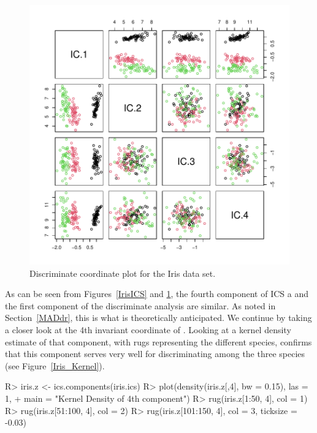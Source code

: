 \documentclass[article,nojss]{jss}
\begin{document}
\begin{figure}[t]
\begin{center}
\includegraphics{ICS-019}
\caption{Discriminate coordinate plot for the Iris data set.}
\label{IrisDisc}
\end{center}
\end{figure}


As can be seen from Figures~\ref{IrisICS} and \ref{IrisDisc}, the fourth component of {ICS} a and the first
component of the discriminate analysis are similar.  As noted in Section~\ref{MADdr}, this is what is theoretically
anticipated. We continue by taking a closer look at the 4th invariant coordinate of . Looking at a
kernel density estimate of that component, with rugs representing the different species,
confirms that this component serves very well for discriminating among the three species (see Figure~\ref{Iris_Kernel}).
\begin{Schunk}
\begin{Sinput}
R> iris.z <- ics.components(iris.ics)
R> plot(density(iris.z[,4], bw = 0.15), las = 1,
+  main = "Kernel Density of 4th component")
R> rug(iris.z[1:50, 4], col = 1)
R> rug(iris.z[51:100, 4], col = 2)
R> rug(iris.z[101:150, 4], col = 3, ticksize = -0.03)
\end{Sinput}
\end{Schunk}
\end{document}
